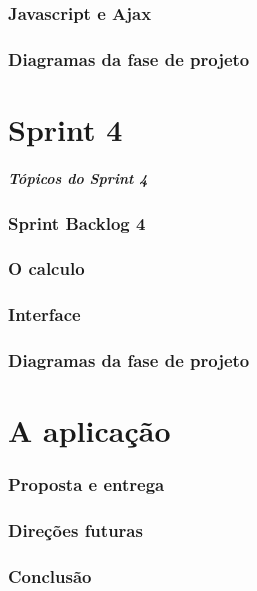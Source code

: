 \documentclass[12pt,a4paper]{beamer}
\begin{document}
		\section{Javascript e Ajax}
		\section{Diagramas da fase de projeto}
	\part{Sprint 4}
		
		\begin{frame}
			\frametitle{Tópicos do Sprint 4}
			\tableofcontents[pausesections]
		\end{frame}	
 		\section{Sprint Backlog 4}
		\section{O calculo}
		\section{Interface}
		\section{Diagramas da fase de projeto}
	\part{A aplicação}
		\section{Proposta e entrega}
		\section{Direções futuras}
		\section{Conclusão}
\end{document}
